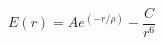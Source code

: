 \documentclass[12pt]{article}
\begin{document}
$$
   E(r) = A e^{(-r/\rho)} -\frac{C}{r^6}
$$
\end{document}
